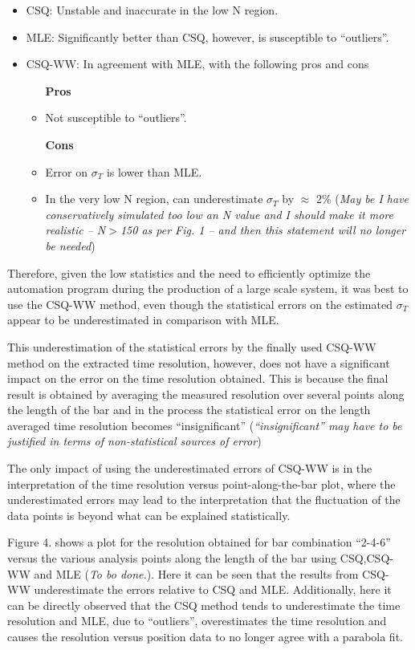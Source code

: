 \documentclass[12pt]{article}
\begin{document}
\begin{itemize}
	\item CSQ: Unstable and inaccurate in the low N region. 
	\item MLE: Significantly better than CSQ, however, is susceptible to ``outliers''.
	\item CSQ-WW: In agreement with MLE, with the following pros and cons
		\begin{itemize}
			\item [\textbf{Pros}]
			\item Not susceptible to ``outliers''.
		\end{itemize}
		\begin{itemize}
			\item [\textbf{Cons}]
			\item Error on $\sigma_{T}$ is lower than MLE.
			\item In the very low N region, can underestimate $\sigma_{T}$ by $\approx$ 2\% (\textit{May be I have conservatively simulated too low an N value and I should make it more realistic -- N$>$150 as per Fig. 1 -- and then this statement will no longer be needed})
		\end{itemize}
\end{itemize}

Therefore, given the low statistics and the need to efficiently optimize the automation program during the production of a large scale system, it was best to use the CSQ-WW method, even though the statistical errors on the estimated $\sigma_{T}$ appear to be underestimated in comparison with MLE.

This underestimation of the statistical errors by the finally used CSQ-WW method on the extracted time resolution, however, does not have a significant impact on the error on the time resolution obtained. This is because the final result is obtained by averaging the measured resolution over several points along the length of the bar and in the process the statistical error on the length averaged time resolution becomes ``insignificant'' (\textit{``insignificant'' may have to be justified in terms of non-statistical sources of error})

The only impact of using the underestimated errors of CSQ-WW is in the interpretation of the time resolution versus point-along-the-bar plot, where the underestimated errors may lead to the interpretation that the fluctuation of the data points is beyond what can be explained statistically. 

Figure 4. shows a plot for the resolution obtained for bar combination ``2-4-6'' versus the various analysis points along the length of the bar using CSQ,CSQ-WW and MLE (\textit{To bo done.}). Here it can be seen that the results from CSQ-WW underestimate the errors relative to CSQ and MLE. Additionally, here it can be directly observed that the CSQ method tends to underestimate the time resolution and MLE, due to ``outliers'', overestimates the time resolution and causes the resolution versus position data to no longer agree with a parabola fit.  
\end{document}
